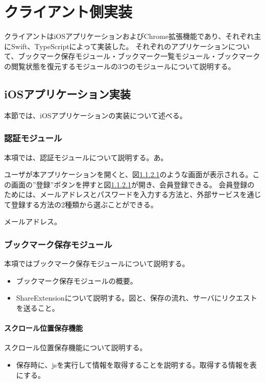 \section{クライアント側実装}
クライアントはiOSアプリケーションおよびChrome拡張機能であり、それぞれ主にSwift、TypeScriptによって実装した。
それぞれのアプリケーションについて、ブックマーク保存モジュール・ブックマーク一覧モジュール・ブックマークの閲覧状態を復元するモジュールの3つのモジュールについて説明する。

\subsection{iOSアプリケーション実装}
本節では、iOSアプリケーションの実装について述べる。

\subsubsection{認証モジュール}
本項では、認証モジュールについて説明する。あ。

ユーザが本アプリケーションを開くと、図\ref{}のような画面が表示される。この画面の”登録”ボタンを押すと図\ref{}が開き、会員登録できる。
会員登録のためには、メールアドレスとパスワードを入力する方法と、外部サービスを通じて登録する方法の2種類から選ぶことができる。

メールアドレス。





\subsubsection{ブックマーク保存モジュール}
本項ではブックマーク保存モジュールについて説明する。
\begin{itemize}
  \item ブックマーク保存モジュールの概要。
  \item ShareExtensionについて説明する。図と、保存の流れ、サーバにリクエストを送ること。
\end{itemize}

\paragraph{スクロール位置保存機能}
スクロール位置保存機能について説明する。
\begin{itemize}
  \item 保存時に、jsを実行して情報を取得することを説明する。取得する情報を表にする。
\end{itemize}

